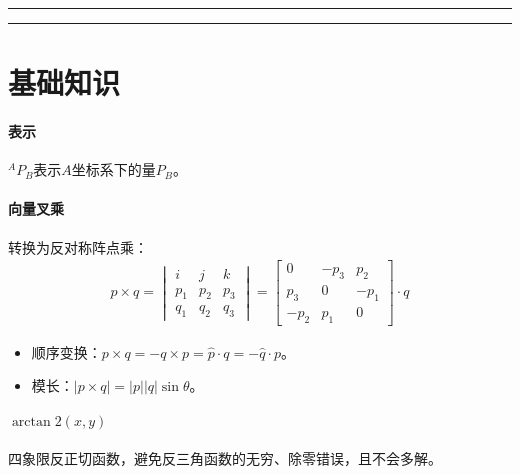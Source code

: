 \documentclass[
12pt, %
a4paper, 
oneside, %
headinclude,footinclude, %
]{scrartcl}
\title{\normalfont\spacedallcaps{机器人学导论}}
\date{}
\begin{document}
\maketitle
\newpage
\hypertarget{toc}{}
\begingroup
\begin{multicols}{2}
\tableofcontents
\end{multicols}
\endgroup
\newpage
\begingroup
\begin{multicols}{2}
\listoffigures
\end{multicols}
\endgroup
\hrule
\begingroup
\begin{multicols}{2}
\listoftables
\end{multicols}
\endgroup
\hrule
\listoftips
\newpage
\section{基础知识}
\paragraph{表示}
$ ^A P_B $表示$ A $坐标系下的量$ P_B $。
\paragraph{向量叉乘}
转换为反对称阵点乘：
\begin{align*}
p \times q
= \begin{vmatrix} i & j & k \\ p_1 & p_2 & p_3 \\ q_1 & q_2 & q_3 \end{vmatrix}
= \begin{bmatrix} 0 & -p_3 & p_2 \\ p_3 & 0 & -p_1 \\ -p_2 & p_1 & 0 \end{bmatrix} \cdot q
\end{align*}

\begin{itemize}
\item 顺序变换：$ p \times q = -q \times p = \hat{p} \cdot q = -\hat{q} \cdot p $。
\item 模长：$ |p \times q| = |p||q|\sin\theta $。
\end{itemize}
\paragraph{$ \arctan 2(x, y) $}
四象限反正切函数，避免反三角函数的无穷、除零错误，且不会多解。
\end{document}
